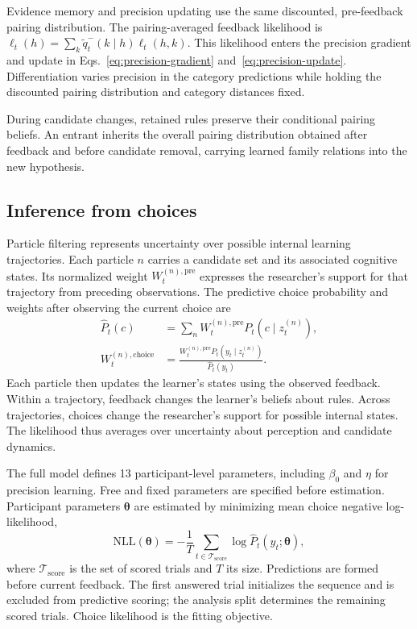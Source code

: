 Evidence memory and precision updating use the same discounted, pre-feedback pairing distribution. The pairing-averaged feedback likelihood is $\ell_t(h)=\sum_k\widetilde q_t^-(k\mid h)\ell_t(h,k)$. This likelihood enters the precision gradient and update in Eqs.~\eqref{eq:precision-gradient} and~\eqref{eq:precision-update}. Differentiation varies precision in the category predictions while holding the discounted pairing distribution and category distances fixed.

During candidate changes, retained rules preserve their conditional pairing beliefs. An entrant inherits the overall pairing distribution obtained after feedback and before candidate removal, carrying learned family relations into the new hypothesis.

\subsection*{Inference from choices}
\label{m:inference}

Particle filtering represents uncertainty over possible internal learning trajectories. Each particle $n$ carries a candidate set and its associated cognitive states. Its normalized weight $W_t^{(n),\mathrm{pre}}$ expresses the researcher's support for that trajectory from preceding observations. The predictive choice probability and weights after observing the current choice are
\begin{align}
\widehat P_t(c)&=\sum_nW_t^{(n),\mathrm{pre}}P_t(c\mid z_t^{(n)}),\\
W_t^{(n),\mathrm{choice}}&=
\frac{W_t^{(n),\mathrm{pre}}P_t(y_t\mid z_t^{(n)})}
{\widehat P_t(y_t)}.
\label{eq:particle-prediction}
\end{align}
Each particle then updates the learner's states using the observed feedback. Within a trajectory, feedback changes the learner's beliefs about rules. Across trajectories, choices change the researcher's support for possible internal states. The likelihood thus averages over uncertainty about perception and candidate dynamics.

The full model defines 13 participant-level parameters, including $\beta_0$ and $\eta$ for precision learning. Free and fixed parameters are specified before estimation. Participant parameters $\bm\theta$ are estimated by minimizing mean choice negative log-likelihood,
\begin{equation}
\mathrm{NLL}(\bm\theta)=-\frac1T\sum_{t\in\mathcal T_{\mathrm{score}}}
\log\widehat P_t(y_t;\bm\theta),
\label{eq:choice-nll}
\end{equation}
where $\mathcal T_{\mathrm{score}}$ is the set of scored trials and $T$ its size. Predictions are formed before current feedback. The first answered trial initializes the sequence and is excluded from predictive scoring; the analysis split determines the remaining scored trials. Choice likelihood is the fitting objective.

